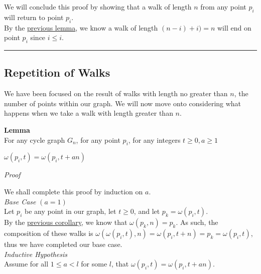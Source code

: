 \documentclass[a4paper,12pt]{article}
\begin{document}
\noindent We will conclude this proof by showing that a walk of length $n$ from any point $p_i$ will return to point $p_i$.\\

\noindent By the \hyperlink{lemma:existence_of_walk_2}{previous lemma}, we know a walk of length $(n - i) + i) = n$ will end on point $p_i$ since $i \leq i$.

\begin{center}
\noindent\rule{8cm}{0.4pt}
\end{center}




\subsection{Repetition of Walks}
\label{sec:repetition_of_walks}

We have been focused on the result of walks with length no greater than $n$, the number of points within our graph. We will now move onto considering what happens when we take a walk with length greater than $n$.\\


\label{lemma:walk_repetition_of_n}
\hypertarget{lemma:walk_repetition_of_n}{}
\begin{tcolorbox}
\textbf{Lemma}\\
For any cycle graph $G_n$, for any point $p_i$, for any integers $t \geq 0, a \geq 1$
\begin{center}
$\omega(p_i, t) = \omega(p_i, t + an)$
\end{center}
\end{tcolorbox}

\noindent
\textit{Proof}

\noindent We shall complete this proof by induction on $a$.\\


\noindent
\textit{Base Case} $(a = 1)$\\
Let $p_i$ be any point in our graph, let $t \geq 0$, and let $p_k = \omega(p_i, t)$.\\

\noindent By the \hyperlink{corollary:inverse_omega_relationship}{previous corollary}, we know that $\omega(p_k, n) = p_k$. As such, the composition of these walks is $\omega(\omega(p_i, t), n) = \omega(p_i, t + n) = p_k = \omega(p_i, t)$, thus we have completed our base case.\\


\noindent
\textit{Inductive Hypothesis}\\
Assume for all $1 \leq a < l$ for some $l$, that $\omega(p_i, t) = \omega(p_i, t + an)$.\\
\end{document}
